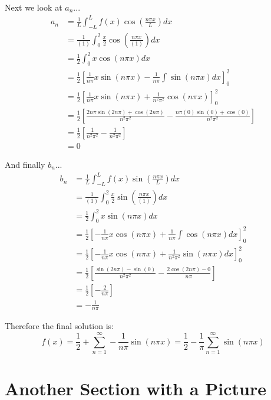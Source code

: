 \documentclass[11pt,letterpaper,twoside]{book}
\begin{document}
Next we look at $a_n$...
\begin{align*}
a_n &= \frac{1}{L}  \int_{-L}^L f(x) \cos \left( \frac{n\pi x}{L} \right) dx \\
    &= \frac{1}{(1)} \int_0^2 \frac{x}{2} \cos \left( \frac{n\pi x}{(1)} \right) dx \\
    &= \frac{1}{2} \int_0^2 x \cos \left( n\pi x \right) dx \\
    &= \frac{1}{2} \left[ \frac{1}{n\pi} x \sin \left( n\pi x \right) - \frac{1}{n\pi} \int \sin \left( n\pi x \right) dx \right]^2_0 \\
    &= \frac{1}{2} \left[ \frac{1}{n\pi} x \sin \left( n\pi x \right) + \frac{1}{n^2\pi^2} \cos \left( n\pi x \right) \right]^2_0 \\
    &= \frac{1}{2} \left[ \frac{2n\pi \sin \left( 2n\pi \right) + \cos \left( 2n\pi \right)}{n^2\pi^2} - \frac{n\pi (0) \sin \left(0 \right) + \cos \left( 0 \right)}{n^2\pi^2} \right] \\
    &= \frac{1}{2} \left[ \frac{1}{n^2\pi^2} - \frac{1}{n^2\pi^2} \right] \\
    &= 0
\end{align*}

And finally $b_n$...
\begin{align*}
b_n &= \frac{1}{L} \int_{-L}^L f(x) \sin \left( \frac{n\pi x}{L} \right) dx \\
    &= \frac{1}{(1)} \int_0^2 \frac{x}{2} \sin \left( \frac{n\pi x}{(1)} \right) dx \\
    &= \frac{1}{2} \int_0^2 x \sin \left( n\pi x \right) dx \\
    &= \frac{1}{2} \left[ - \frac{1}{n\pi} x \cos \left( n\pi x \right) + \frac{1}{n\pi} \int \cos \left( n\pi x \right) dx \right]^2_0 \\
    &= \frac{1}{2} \left[ - \frac{1}{n\pi} x \cos \left( n\pi x \right) + \frac{1}{n^2\pi^2} \sin \left( n\pi x \right) dx \right]^2_0 \\
    &= \frac{1}{2} \left[ \frac{\sin (2n\pi) - \sin(0)}{ n^2\pi^2 } - \frac{2\cos(2n\pi) - 0 }{n\pi} \right] \\
    &= \frac{1}{2} \left[ -\frac{2}{n\pi} \right] \\
    &= - \frac{1}{n\pi}
\end{align*}

Therefore the final solution is:
\[
f(x) = \frac{1}{2} + \sum_{n=1}^\infty -\frac{1}{n\pi} \sin (n\pi x) = \frac{1}{2} - \frac{1}{\pi} \sum_{n=1}^\infty \sin (n\pi x)
\]
\lipsum[8]

\section{Another Section with a Picture}
\end{document}
